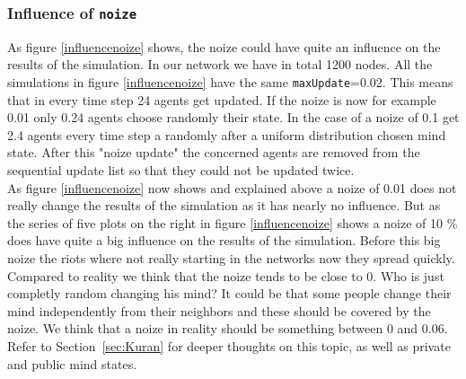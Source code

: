 \subsubsection{Influence of \texttt{noize}}
\label{sec:influencenoize}
As figure \ref{influencenoize} shows, the noize could have quite an influence on the results of the simulation. In our network we have in total 1200 nodes. All the simulations in figure \ref{influencenoize} have the same \texttt{maxUpdate}=0.02. This means that in every time step 24 agents get updated. If the noize is now for example 0.01 only 0.24 agents choose randomly their state. In the case of a noize of 0.1 get 2.4 agents every time step a randomly after a uniform distribution chosen mind state. After this "noize update" the concerned agents are removed from the sequential update list so that they could not be updated twice.\\
As figure \ref{influencenoize} now shows and explained above a noize of 0.01 does not really change the results of the simulation as it has nearly no influence. But as the series of five plots on the right in figure \ref{influencenoize} shows a noize of 10 $\%$ does have quite a big influence on the results of the simulation. Before this big noize the riots where not really starting in the networks now they spread quickly.\\
Compared to reality we think that the noize tends to be close to 0. Who is just
completly random changing his mind? It could be that some people change their
mind independently from their neighbors and these should be covered by the
noize. We think that a noize in reality should be something between 0 and
0.06.  Refer to Section~\ref{sec:Kuran} for deeper thoughts on this topic, as
well as private and public mind states.

